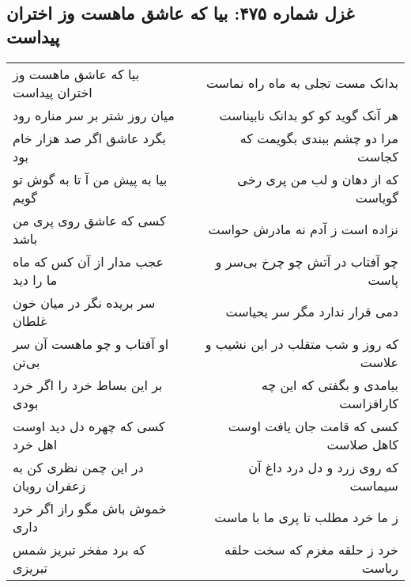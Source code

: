 \begin{center}
\section*{غزل شماره ۴۷۵: بیا که عاشق ماهست وز اختران پیداست}
\label{sec:0475}
\begin{longtable}{l p{0.5cm} r}
بیا که عاشق ماهست وز اختران پیداست
&&
بدانک مست تجلی به ماه راه نماست
\\
میان روز شتر بر سر مناره رود
&&
هر آنک گوید کو کو بدانک نابیناست
\\
بگرد عاشق اگر صد هزار خام بود
&&
مرا دو چشم ببندی بگویمت که کجاست
\\
بیا به پیش من آ تا به گوش تو گویم
&&
که از دهان و لب من پری رخی گویاست
\\
کسی که عاشق روی پری من باشد
&&
نزاده است ز آدم نه مادرش حواست
\\
عجب مدار از آن کس که ماه ما را دید
&&
چو آفتاب در آتش چو چرخ بی‌سر و پاست
\\
سر بریده نگر در میان خون غلطان
&&
دمی قرار ندارد مگر سر یحیاست
\\
او آفتاب و چو ماهست آن سر بی‌تن
&&
که روز و شب متقلب در این نشیب و علاست
\\
بر این بساط خرد را اگر خرد بودی
&&
بیامدی و بگفتی که این چه کارافزاست
\\
کسی که چهره دل دید اوست اهل خرد
&&
کسی که قامت جان یافت اوست کاهل صلاست
\\
در این چمن نظری کن به زعفران رویان
&&
که روی زرد و دل درد داغ آن سیماست
\\
خموش باش مگو راز اگر خرد داری
&&
ز ما خرد مطلب تا پری ما با ماست
\\
که برد مفخر تبریز شمس تبریزی
&&
خرد ز حلقه مغزم که سخت حلقه رباست
\\
\end{longtable}
\end{center}
